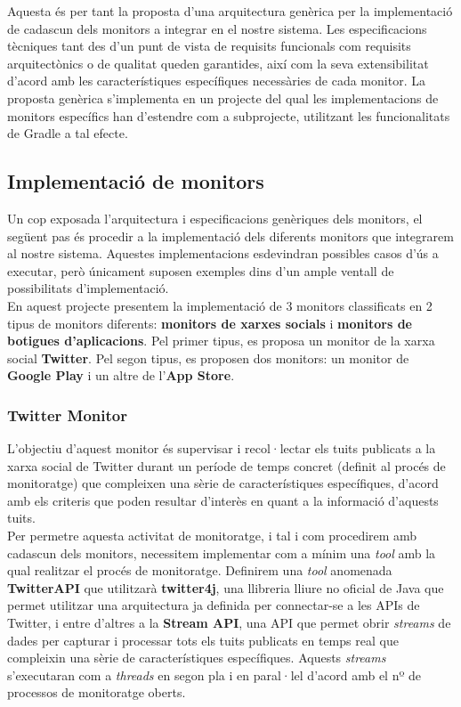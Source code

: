 Aquesta és per tant la proposta d'una arquitectura genèrica per la implementació de cadascun dels monitors a integrar en el nostre sistema. Les especificacions tècniques tant des d'un punt de vista de requisits funcionals com requisits arquitectònics o de qualitat queden garantides, així com la seva extensibilitat d'acord amb les característiques específiques necessàries de cada monitor. La proposta genèrica s'implementa en un projecte del qual les implementacions de monitors específics han d'estendre com a subprojecte, utilitzant les funcionalitats de Gradle a tal efecte.

\subsection{Implementació de monitors}

Un cop exposada l'arquitectura i especificacions genèriques dels monitors, el següent pas és procedir a la implementació dels diferents monitors que integrarem al nostre sistema. Aquestes implementacions esdevindran possibles casos d'ús a executar, però únicament suposen exemples dins d'un ample ventall de possibilitats d'implementació.\\

En aquest projecte presentem la implementació de 3 monitors classificats en 2 tipus de monitors diferents: \textbf{monitors de xarxes socials} i \textbf{monitors de botigues d'aplicacions}. Pel primer tipus, es proposa un monitor de la xarxa social \textbf{Twitter}. Pel segon tipus, es proposen dos monitors: un monitor de \textbf{Google Play} i un altre de l'\textbf{App Store}.

\subsubsection{Twitter Monitor}

L'objectiu d'aquest monitor és supervisar i recol·lectar els tuits publicats a la xarxa social de Twitter durant un període de temps concret (definit al procés de monitoratge) que compleixen una sèrie de característiques específiques, d'acord amb els criteris que poden resultar d'interès en quant a la informació d'aquests tuits. \\

Per permetre aquesta activitat de monitoratge, i tal i com procedirem amb cadascun dels monitors, necessitem implementar com a mínim una \textit{tool} amb la qual realitzar el procés de monitoratge. Definirem una \textit{tool} anomenada \textbf{TwitterAPI} que utilitzarà \textbf{twitter4j}, una llibreria lliure no oficial de Java que permet utilitzar una arquitectura ja definida per connectar-se a les APIs de Twitter, i entre d'altres a la \textbf{Stream API}, una API que permet obrir \textit{streams} de dades per capturar i processar tots els tuits publicats en temps real que compleixin una sèrie de característiques específiques. Aquests \textit{streams} s'executaran com a \textit{threads} en segon pla i en paral·lel d'acord amb el nº de processos de monitoratge oberts.\\

